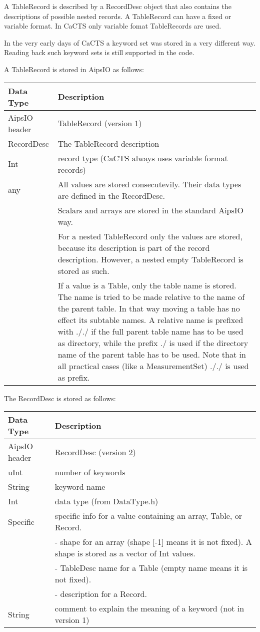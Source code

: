 A TableRecord is described by a RecordDesc object that also
contains the descriptions of possible nested records. A TableRecord
can have a fixed or variable format. In CaCTS only variable fomat
TableRecords are used.

In the very early days of CaCTS a keyword set was stored in a very
different way. Reading back such keyword sets is still supported in
the code.

A TableRecord is stored in AipsIO as follows:

\vspace{0.15in}
\begin{tabular}{|l|p{13cm}|} \hline
  Data Type & Description \\ \hline\hline
  AipsIO header & TableRecord (version 1) \\
  RecordDesc & The TableRecord description \\
  Int & record type (CaCTS always uses variable format records) \\
  any & All values are stored consecutevily.
  Their data types are defined in the RecordDesc.
   \tabularnewline & Scalars and arrays are stored in the standard AipsIO way.
   \tabularnewline & For a nested TableRecord only the values are
   stored, because its description is part of the record
   description. However, a nested empty TableRecord is stored as such.
  \tabularnewline & If a value is a Table, only the table name is
  stored. The name is tried to be made relative to the
  name of the parent table. In that way moving a table has no effect
  its subtable names. A relative name is prefixed with
  ././ if the full parent table name has to be used as
  directory, while the prefix ./ is used if the directory name of
  the parent table has to be used. Note that in all practical cases
  (like a MeasurementSet) ././ is used as prefix. \\
  \hline
\end{tabular}
\vspace{0.15in}

The RecordDesc is stored as follows:

\vspace{0.15in}
\begin{tabular}{|l|p{13cm}|} \hline
  Data Type & Description \\ \hline\hline
  AipsIO header & RecordDesc (version 2) \\
  uInt & number of keywords \\
  String & keyword name \\
  Int & data type (from DataType.h) \\
  Specific & specific info for a value containing an array, Table, or Record.
  \tabularnewline & - shape for an array (shape [-1] means it is not
  fixed). A shape is stored as a vector of Int values.
  \tabularnewline & - TableDesc name for a Table (empty name means it is not fixed).
  \tabularnewline & - description for a Record. \\
  String & comment to explain the meaning of a keyword (not in version 1) \\
  \hline
\end{tabular}
\vspace{0.15in}

